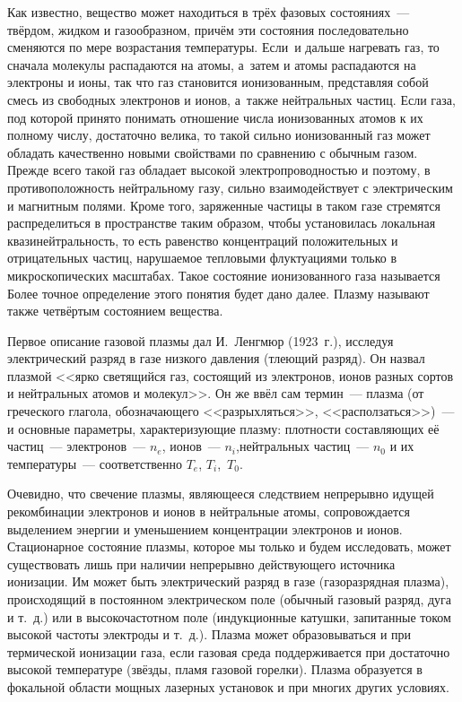 
Как известно, вещество может находиться в трёх фазовых состояниях~--- твёрдом, жидком и газообразном, причём эти
состояния последовательно сменяются по мере возрастания температуры. Если~и дальше нагревать газ, то сначала молекулы распадаются на атомы, а~затем и атомы распадаются на электроны и ионы, так что газ становится ионизованным, представляя собой смесь из свободных электронов и ионов, а~также нейтральных частиц. Если  газа, под которой принято понимать отношение числа ионизованных атомов к их полному числу, достаточно велика, то такой сильно ионизованный газ может обладать качественно новыми свойствами по сравнению с обычным газом. Прежде всего такой газ обладает высокой электропроводностью и поэтому, в противоположность нейтральному газу, сильно взаимодействует с электрическим и магнитным полями. Кроме того, заряженные частицы в таком газе стремятся распределиться в пространстве таким образом, чтобы установилась локальная квазинейтральность, то есть равенство концентраций положительных и отрицательных частиц, нарушаемое тепловыми флуктуациями только в микроскопических масштабах. Такое состояние ионизованного газа называется   Более точное определение этого понятия будет дано далее. Плазму называют также четвёртым состоянием вещества.


Первое описание газовой плазмы дал И.~Ленгмюр (1923~г.), исследуя электрический разряд в газе низкого давления (тлеющий разряд). Он назвал плазмой <<ярко светящийся газ, состоящий из электронов, ионов разных сортов и нейтральных атомов и молекул>>. Он же ввёл сам термин~--- плазма (от греческого глагола, обозначающего <<разрыхляться>>, <<расползаться>>)~--- и основные параметры, характеризующие плазму: плотности составляющих её частиц~--- электронов~--- $n_e$, ионов~--- $n_i$,нейтральных частиц~--- $n_0$ и их температуры~--- соответственно $T_e$, $T_i$,~$T_0$.

Очевидно, что свечение плазмы, являющееся следствием непрерывно идущей рекомбинации электронов и ионов в нейтральные атомы, сопровождается выделением энергии и уменьшением концентрации электронов и ионов. Стационарное состояние плазмы, которое мы только и будем исследовать, может существовать лишь при наличии непрерывно действующего источника ионизации. Им может быть электрический разряд в газе (газоразрядная плазма), происходящий в постоянном электрическом поле (обычный газовый разряд, дуга и т.~д.) или в высокочастотном поле (индукционные катушки, запитанные током высокой частоты электроды и т.~д.). Плазма может образовываться и при термической ионизации газа, если газовая среда поддерживается при достаточно высокой температуре (звёзды, пламя газовой горелки). Плазма образуется в фокальной области мощных лазерных установок и при многих других условиях.

